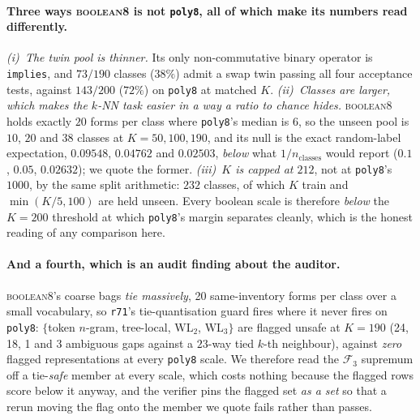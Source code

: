 \paragraph{Three ways \textsc{boolean8} is not \texttt{poly8}, all of which make its numbers read differently.} \emph{(i)~The twin pool is thinner.} Its only non-commutative binary operator is \texttt{implies}, and $73/190$ classes ($38\%$) admit a swap twin passing all four acceptance tests, against $143/200$ ($72\%$) on \texttt{poly8} at matched $K$. \emph{(ii)~Classes are larger, which makes the $k$-NN task easier in a way a ratio to chance hides.} \textsc{boolean8} holds exactly $20$ forms per class where \texttt{poly8}'s median is $6$, so the unseen pool is $10$, $20$ and $38$ classes at $K{=}50,100,190$, and its null is the exact random-label expectation, $0.09548$, $0.04762$ and $0.02503$, \emph{below} what $1/n_{\text{classes}}$ would report ($0.1$, $0.05$, $0.02632$); we quote the former. \emph{(iii)~$K$ is capped at $212$}, not at \texttt{poly8}'s $1000$, by the same split arithmetic: $232$ classes, of which $K$ train and $\min(K/5,100)$ are held unseen. Every boolean scale is therefore \emph{below} the $K{=}200$ threshold at which \texttt{poly8}'s margin separates cleanly, which is the honest reading of any comparison here.

\paragraph{And a fourth, which is an audit finding about the auditor.} \textsc{boolean8}'s coarse bags \emph{tie massively}, 20 same-inventory forms per class over a small vocabulary, so \texttt{r71}'s tie-quantisation guard fires where it never fires on \texttt{poly8}: $\{$token $n$-gram, tree-local, $\mathrm{WL}_2$, $\mathrm{WL}_3\}$ are flagged unsafe at $K{=}190$ (24, 18, 1 and 3 ambiguous gaps against a $23$-way tied $k$-th neighbour), against \emph{zero} flagged representations at every \texttt{poly8} scale. We therefore read the $\mathcal{F}_3$ supremum off a tie-\emph{safe} member at every scale, which costs nothing because the flagged rows score below it anyway, and the verifier pins the flagged set \emph{as a set} so that a rerun moving the flag onto the member we quote fails rather than passes.


